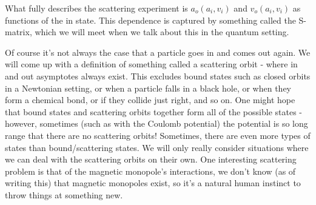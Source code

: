 \documentclass{article}
\begin{document}
What fully describes the scattering experiment is $a_o(a_i,v_i)$ and $v_o(a_i,v_i)$ as functions of the in state. This dependence is captured by something called the S-matrix, which we will meet when we talk about this in the quantum setting.

Of course it's not always the case that a particle goes in and comes out again. We will come up with a definition of something called a scattering orbit - where in and out asymptotes always exist. This excludes bound states such as closed orbits in a Newtonian setting, or when a particle falls in a black hole, or when they form a chemical bond, or if they collide just right, and so on. One might hope that bound states and scattering orbits together form all of the possible states - however, sometimes (such as with the Coulomb potential) the potential is so long range that there are no scattering orbits! Sometimes, there are even more types of states than bound/scattering states. We will only really consider situations where we can deal with the scattering orbits on their own. One interesting scattering problem is that of the magnetic monopole's interactions, we don't know (as of writing this) that magnetic monopoles exist, so it's a natural human instinct to throw things at something new.
\end{document}
